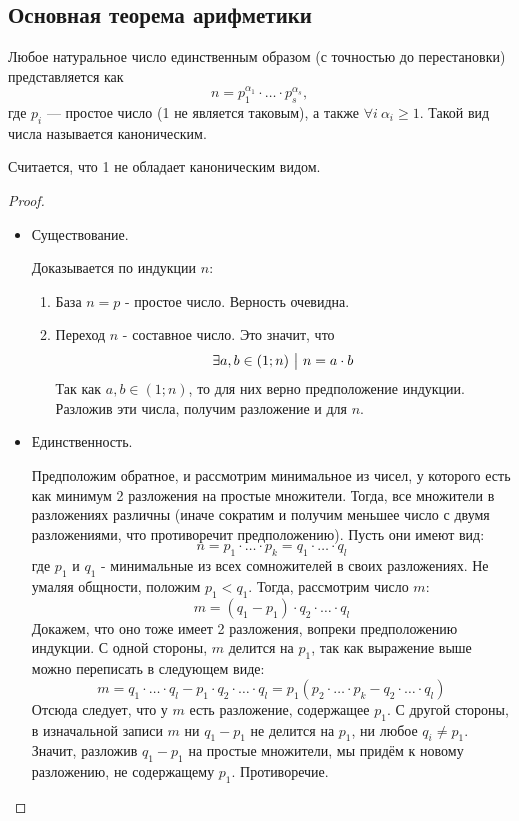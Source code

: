 \subsection{Основная теорема арифметики}

\begin{theorem}
	Любое натуральное число единственным образом (с точностью до перестановки) представляется как
	\[
	n = p_1^{\alpha_1} \cdot \ldots \cdot p_s^{\alpha_s},
	\]
	где $p_i$ --- простое число (1 не является таковым), а также $\forall i\ \alpha_i \ge 1$. Такой вид числа называется каноническим.
\end{theorem}

\begin{note}
	Считается, что 1 не обладает каноническим видом.
\end{note}

\begin{proof}~
	\begin{itemize}
		\item Существование.
		
		Доказывается по индукции $n$:
		\begin{enumerate}
			\item База $n = p$ - простое число. Верность очевидна.
			
			\item Переход $n$ - составное число. Это значит, что
			\[
				\exists a, b \in (1; n) \ \big|\  n = a \cdot b
			\]
			Так как $a, b \in (1; n)$, то для них верно предположение индукции. Разложив эти числа, получим разложение и для $n$.
		\end{enumerate}
	
		\item Единственность.
		
		Предположим обратное, и рассмотрим минимальное из чисел, у которого есть как минимум 2 разложения на простые множители. Тогда, все множители в разложениях различны (иначе сократим и получим меньшее число с двумя разложениями, что противоречит предположению). Пусть они имеют вид:
		\[
			n = p_1 \cdot \ldots \cdot p_k = q_1 \cdot \ldots \cdot q_l
		\]
		где $p_1$ и $q_1$ - минимальные из всех сомножителей в своих разложениях. Не умаляя общности, положим $p_1 < q_1$. Тогда, рассмотрим число $m$:
		\[
			m = (q_1 - p_1) \cdot q_2 \cdot \ldots \cdot q_l
		\]
		Докажем, что оно тоже имеет 2 разложения, вопреки предположению индукции. С одной стороны, $m$ делится на $p_1$, так как выражение выше можно переписать в следующем виде:
		\[
			m = q_1 \cdot \ldots \cdot q_l - p_1 \cdot q_2 \cdot \ldots \cdot q_l = p_1 (p_2 \cdot \ldots \cdot p_k - q_2 \cdot \ldots \cdot q_l)
		\]
		Отсюда следует, что у $m$ есть разложение, содержащее $p_1$. С другой стороны, в изначальной записи $m$ ни $q_1 - p_1$ не делится на $p_1$, ни любое $q_i \neq p_1$. Значит, разложив $q_1 - p_1$ на простые множители, мы придём к новому разложению, не содержащему $p_1$. Противоречие.
	\end{itemize}
\end{proof}


